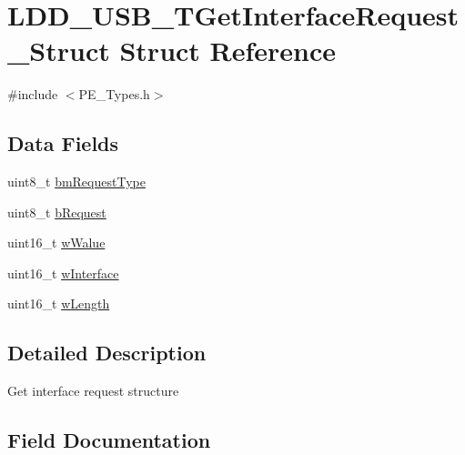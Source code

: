 \hypertarget{struct_l_d_d___u_s_b___t_get_interface_request___struct}{}\section{L\+D\+D\+\_\+\+U\+S\+B\+\_\+\+T\+Get\+Interface\+Request\+\_\+\+Struct Struct Reference}
\label{struct_l_d_d___u_s_b___t_get_interface_request___struct}


{\ttfamily \#include $<$P\+E\+\_\+\+Types.\+h$>$}

\subsection*{Data Fields}
\begin{DoxyCompactItemize}
\item 
uint8\+\_\+t \hyperlink{struct_l_d_d___u_s_b___t_get_interface_request___struct_abea120ea756eb0abdb8aafb8713f61f4}{bm\+Request\+Type}
\item 
uint8\+\_\+t \hyperlink{struct_l_d_d___u_s_b___t_get_interface_request___struct_a1e7be110861bd4ff75c86d5214f31543}{b\+Request}
\item 
uint16\+\_\+t \hyperlink{struct_l_d_d___u_s_b___t_get_interface_request___struct_aac9a6f9b53fad87aa679e25f4cc7e74d}{w\+Walue}
\item 
uint16\+\_\+t \hyperlink{struct_l_d_d___u_s_b___t_get_interface_request___struct_abb1bc39d2124fe5304116b96ac84510e}{w\+Interface}
\item 
uint16\+\_\+t \hyperlink{struct_l_d_d___u_s_b___t_get_interface_request___struct_a496c03443b177fd2e6c93616064d2934}{w\+Length}
\end{DoxyCompactItemize}


\subsection{Detailed Description}
Get interface request structure 

\subsection{Field Documentation}
\mbox{\label{struct_l_d_d___u_s_b___t_get_interface_request___struct_abea120ea756eb0abdb8aafb8713f61f4}} 
